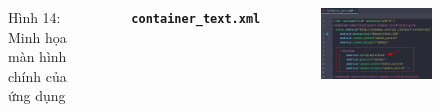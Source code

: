 \documentclass{beamer}
\begin{document}
\begin{frame}
\begin{columns}
\begin{figure}
            \caption{\centering\tiny{Hình 14: Minh họa màn hình chính của ứng dụng}}
        \end{figure}
        \indent \textbf{\texttt{container\_text.xml}}
        \begin{figure}
            \centering
            \includegraphics[width=\textwidth]{images/16.png}
        \end{figure}
    \end{columns}
\end{frame}
\end{document}
